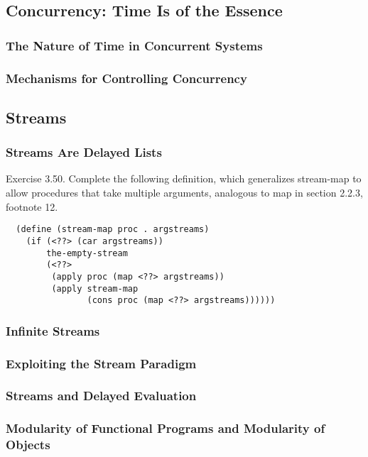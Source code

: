        \subsection{Concurrency: Time Is of the Essence}
            \subsubsection{The Nature of Time in Concurrent Systems}
            \subsubsection{Mechanisms for Controlling Concurrency}
        \subsection{Streams}
            \subsubsection{Streams Are Delayed Lists}
Exercise 3.50.  Complete the following definition, which generalizes stream-map to allow procedures that take multiple arguments, analogous to map in section 2.2.3, footnote 12.
\begin{verbatim}
  (define (stream-map proc . argstreams)
    (if (<??> (car argstreams))
        the-empty-stream
        (<??>
         (apply proc (map <??> argstreams))
         (apply stream-map
                (cons proc (map <??> argstreams))))))
\end{verbatim}
            \subsubsection{Infinite Streams}
            \subsubsection{Exploiting the Stream Paradigm}
            \subsubsection{Streams and Delayed Evaluation}
            \subsubsection{Modularity of Functional Programs and Modularity of Objects}

